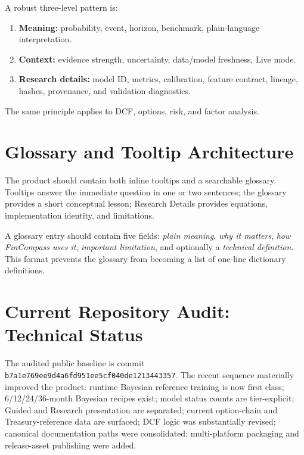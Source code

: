 \documentclass[11pt]{article}
\begin{document}
A robust three-level pattern is:
\begin{enumerate}[itemsep=0.2em]
\item \textbf{Meaning:} probability, event, horizon, benchmark, plain-language interpretation.
\item \textbf{Context:} evidence strength, uncertainty, data/model freshness, Live mode.
\item \textbf{Research details:} model ID, metrics, calibration, feature contract, lineage, hashes, provenance, and validation diagnostics.
\end{enumerate}
The same principle applies to DCF, options, risk, and factor analysis.

\section{Glossary and Tooltip Architecture}
The product should contain both inline tooltips and a searchable glossary. Tooltips answer the immediate question in one or two sentences; the glossary provides a short conceptual lesson; Research Details provides equations, implementation identity, and limitations.

A glossary entry should contain five fields: \emph{plain meaning}, \emph{why it matters}, \emph{how FinCompass uses it}, \emph{important limitation}, and optionally a \emph{technical definition}. This format prevents the glossary from becoming a list of one-line dictionary definitions.

\section{Current Repository Audit: Technical Status}
The audited public baseline is commit \texttt{b7a1e769ee9d4a6fd951ee5cf040de1213443357}. The recent sequence materially improved the product: runtime Bayesian reference training is now first class; 6/12/24/36-month Bayesian recipes exist; model status counts are tier-explicit; Guided and Research presentation are separated; current option-chain and Treasury-reference data are surfaced; DCF logic was substantially revised; canonical documentation paths were consolidated; multi-platform packaging and release-asset publishing were added.
\end{document}
